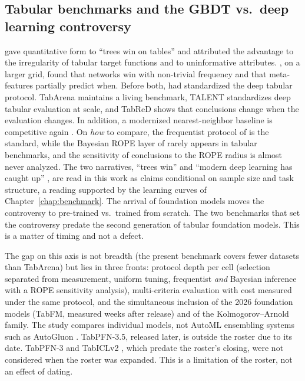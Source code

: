 \subsection{Tabular benchmarks and the GBDT vs.\ deep learning controversy}
\label{sec:rel-benchmarks}

\citet{grinsztajn2022} gave quantitative form to ``trees win on tables'' and attributed the advantage to the
irregularity of tabular target functions and to uninformative
attributes. \citet{mcelfresh2023}, on a larger grid, found that
networks win with non-trivial frequency and that meta-features
partially predict when. Before both, \citet{gorishniy2021} had standardized the deep tabular protocol. TabArena
\citep{tabarena2025} maintains a living benchmark, TALENT
\citep{talent2024,ye2024closer} standardizes deep tabular evaluation
at scale, and TabReD \citep{tabred2024} shows that conclusions change
when the evaluation changes. In addition, a modernized
nearest-neighbor baseline is competitive again \citep{modernnca2025}.
On \emph{how} to compare, the frequentist protocol of
\citet{demsar2006} is the standard, while the Bayesian ROPE layer of
\citet{benavoli2017} rarely appears in tabular benchmarks, and the
sensitivity of conclusions to the ROPE radius is almost never
analyzed. The two narratives, ``trees win'' and ``modern deep learning has caught up'' \citep{realmlp2024,tabm2025}, are read in this work as claims conditional on sample size and task structure, a reading supported by the learning curves of Chapter~\ref{chap:benchmark}. The arrival of foundation models moves the
controversy to pre-trained vs.\ trained from scratch.
The two benchmarks that set the controversy \citep{grinsztajn2022,mcelfresh2023} predate the second generation of tabular foundation models. This is a matter of timing and not a defect.

The gap on this axis is not breadth (the present benchmark covers fewer datasets than TabArena) but lies in three fronts: protocol depth per cell (selection separated from measurement, uniform tuning, frequentist \emph{and} Bayesian inference with a ROPE sensitivity analysis), multi-criteria evaluation with cost measured under the same protocol, and the simultaneous inclusion of the 2026 foundation models (TabFM, measured
weeks after release) and of the Kolmogorov--Arnold family. The study
compares individual models, not AutoML ensembling systems such as AutoGluon \citep{erickson2020}.
TabPFN-3.5, released later, is outside the roster due to its date. TabPFN-3 and TabICLv2 \citep{tabpfn3-2026,tabiclv2-2026}, which
predate the roster's closing, were not considered when the roster was expanded.
This is a limitation of the roster, not an effect of dating.

